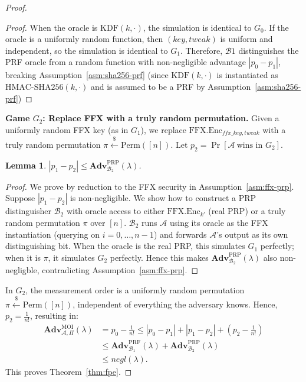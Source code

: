\documentclass{ieeeaccess}
\newtheorem{lemma}{Lemma}[section]
\newcommand{\Adv}{\mathbf{Adv}}
\begin{document}
\begin{proof}
\begin{proof}
When the oracle is $\mathrm{KDF}(k,\cdot)$, the simulation is identical to $G_0$.
If the oracle is a uniformly random function, then
$(\mathit{key},\mathit{tweak})$ is uniform and independent, so the simulation is
identical to $G_1$.
Therefore, $\mathcal{B}1$ distinguishes the PRF oracle from a random function
with non-negligible advantage $|p_0-p_1|$, breaking Assumption~\ref{asm:sha256-prf} (since $\mathrm{KDF}(k,\cdot)$ is instantiated as
$\mathrm{HMAC\text{-}SHA256}(k,\cdot)$ and is assumed to be a PRF by
Assumption~\ref{asm:sha256-prf})
\end{proof}

 
\medskip
\noindent\textbf{Game $G_2$: Replace FFX with a truly random permutation.}
Given a uniformly random FFX key (as in $G_1$), we replace
$\mathrm{FFX.Enc}_{\mathit{ffx\_key},\mathit{tweak}}$ with a truly random
permutation $\pi \xleftarrow{\$} \mathrm{Perm}([n])$.
Let $p_2 = \Pr[\mathcal{A}\ \text{wins in }G_2]$.
 
\begin{lemma}
\label{lem:fpe-g1-g2}
$|p_1 - p_2| \leq \Adv^{\mathrm{PRP}}_{\mathcal{B}_2}(\lambda)$.
\end{lemma}
\begin{proof}
We prove by reduction to the FFX security in Assumption~\ref{asm:ffx-prp}.
Suppose $|p_1 - p_2|$ is non-negligible.
We show how to construct a PRP distinguisher $\mathcal{B}_2$ with oracle access to
either $\mathrm{FFX.Enc}_{k'}$ (real PRP) or a truly random
permutation $\pi$ over $[n]$.
$\mathcal{B}_2$ runs $\mathcal{A}$ using its oracle as the FFX instantiation
(querying on $i = 0,\dots,n-1$) and forwards $\mathcal{A}$'s output as
its own distinguishing bit.
When the oracle is the real PRP, this simulates $G_1$ perfectly;
when it is $\pi$, it simulates $G_2$ perfectly.
Hence this makes $\Adv^{\mathrm{PRP}}_{\mathcal{B}_2}(\lambda)$ also non-negligble,
contradicting Assumption~\ref{asm:ffx-prp}.
\end{proof}
 
In $G_2$, the measurement order is a uniformly random permutation
$\pi \xleftarrow{\$} \mathrm{Perm}([n])$, independent of everything the
adversary knows.
Hence, $p_2 = \frac{1}{n!}$, resulting in:
\[
\begin{aligned}
  \Adv^{\mathrm{MOI}}_{\mathcal{A},\Pi}(\lambda)
  &= p_0 - \tfrac{1}{n!}
  \leq |p_0 - p_1| + |p_1 - p_2| + (p_2 - \tfrac{1}{n!})\\
  &\leq \Adv^{\mathrm{PRF}}_{\mathcal{B}_1}(\lambda)
       + \Adv^{\mathrm{PRP}}_{\mathcal{B}_2}(\lambda)\\
  &\leq \mathit{negl}(\lambda).
\end{aligned}
\]
This proves Theorem~\ref{thm:fpe}.

\end{proof}
\end{document}
